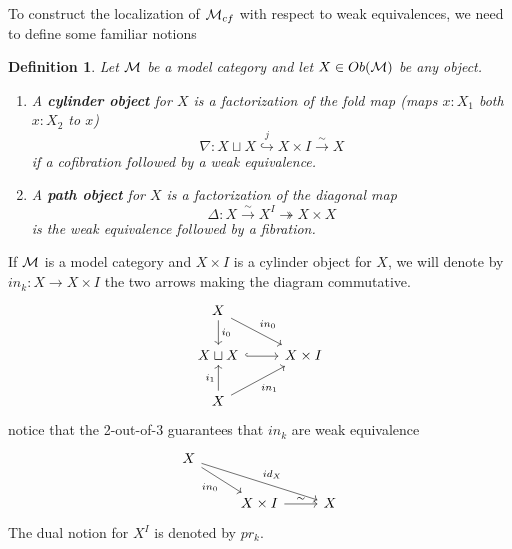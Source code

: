 \documentclass[11pt]{article}
\newtheorem{dfn}[thm]{Definition}
\newcommand{\calm}{{\cal M}}
\newcommand{\lrta}{\longrightarrow}
\newcommand{\inj}{\hookrightarrow}
\newcommand{\surj}{\twoheadrightarrow}
\begin{document}
To construct the localization of $\calm_{cf}$ with respect to weak equivalences, we need to define some familiar notions
\begin{dfn}
Let $\calm$ be a model category and let $X\in Ob(\calm)$ be any object.
\begin{enumerate}
\item A \textbf{cylinder object} for $X$ is a factorization of the fold map (maps $x:X_1$ both $x:X_2$ to $x$)
$$
\nabla: X\sqcup X\overset{j}{\inj} X\times I\overset{\sim}{\lrta}X 
$$
if a cofibration followed by a weak equivalence.
\item A \textbf{path object} for $X$ is a factorization of the diagonal map
$$
\Delta:X\overset{\sim}{\lrta}X^I\surj X\times X
$$
is the weak equivalence followed by a fibration.
\end{enumerate}
\end{dfn}

If $\calm$ is a model category and $X\times I$ is a cylinder object for $X$, we will denote by $in_k:X\lrta X\times I$ the two arrows making the diagram commutative.
$$
\begin{tikzcd}
X \arrow[d, "i_0"] \arrow[rd, "in_0"] &  \\
X\sqcup X \arrow[r, hook] & X\times I \\
X \arrow[u, "i_1"] \arrow[ru, "in_1"'] & 
\end{tikzcd}
$$
notice that the 2-out-of-3 guarantees that $in_k$ are weak equivalence
$$
\begin{tikzcd}
X \arrow[rd, "in_0"'] \arrow[rrd, "id_X"] &  &  \\
 & X\times I \arrow[r, "\sim"] & X
\end{tikzcd}
$$
The dual notion for $X^I$ is denoted by $pr_k$.
\end{document}
